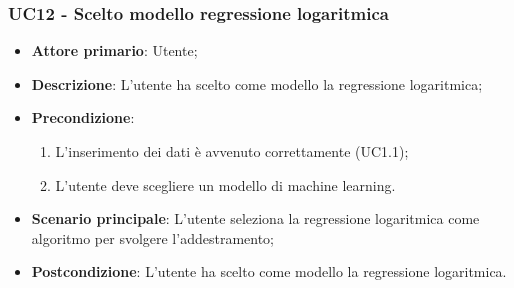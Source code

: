 \subsubsection{UC12 - Scelto modello regressione logaritmica}
\label{sssec:uc12}
\begin{itemize}
  \item \textbf{Attore primario}: Utente;
  \item \textbf{Descrizione}: L'utente ha scelto come modello la regressione logaritmica;
  \item \textbf{Precondizione}:
  \begin{enumerate}
    \item L'inserimento dei dati è avvenuto correttamente (UC1.1);
    \item L'utente deve scegliere un modello di machine learning.
  \end{enumerate}
  \item \textbf{Scenario principale}: L'utente seleziona la regressione logaritmica come algoritmo per svolgere l'addestramento;
  \item \textbf{Postcondizione}: L'utente ha scelto come modello la regressione logaritmica.
\end{itemize}
